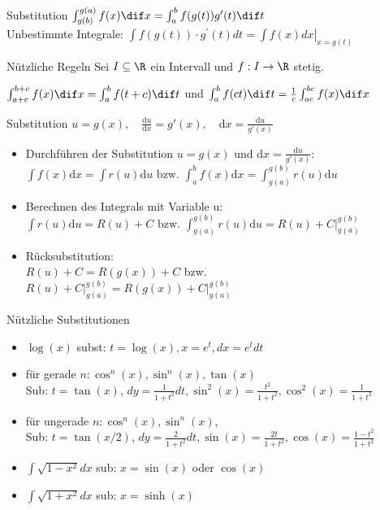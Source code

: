 \begin{theorem}{Substitution}
    $\int_{g(b)}^{g(a)} f(x) \dif x = \int_{a}^b f(g(t)) g'(t) \dif t$
    \vspace{1mm}\\
   Unbestimmte Integrale: $\int f(g(t)) \cdot g^{\prime}(t) d t=\left.\int f(x) d x\right|_{x=g(t)}$
\end{theorem}

\begin{corollary}{Nützliche Regeln}
	Sei $I \subseteq \R$ ein Intervall und $f: I \to \R$ stetig.
    
    $\int_{a+c}^{b+c} f(x) \dif x = \int_{a}^{b} f(t+c) \dif t$ und $\int_{a}^{b} f(ct) \dif t = \frac{1}{c} \int_{ac}^{bc} f(x) \dif x$
\end{corollary}

\begin{KR}{Substitution}
    $u=g(x),\quad \frac{\mathrm{d}u}{\mathrm{d}x}=g'(x),\quad \mathrm{d}x = \frac{\mathrm{d}u}{g'(x)} $
    \begin{itemize}
	\item Durchführen der Substitution \(u=g(x) \)	 und \(\mathrm{d}x=\frac{\mathrm{d}u}{g'(x)} \):\\
	    $\int{f(x)\mathrm{d}x}=\int{r(u)}{\mathrm{d}u} \text{ bzw. } \int_a^b{f(x)\mathrm{d}x}=\int_{g(a)}^{g(b)}{r(u)}{\mathrm{d}u}$
	\item Berechnen des Integrals mit Variable u:\\
	    $\int{r(u)\mathrm{d}u}=R(u)+C \text{ bzw. } \int_{g(a)}^{g(b)}{r(u)\mathrm{d}u}=R(u)+C\Big|_{g(a)}^{g(b)}$
	\item Rücksubstitution:\\
	    $R(u)+C=R(g(x))+C$ bzw. $R(u)+C\Big|_{g(a)}^{g(b)}=R(g(x))+C\Big|_{g(a)}^{g(b)}$
    \end{itemize}	
\end{KR}


\begin{example2}{Nützliche Substitutionen}
    \begin{itemize}
        \item $\log (x)$ subst: $t=\log (x), x=e^{t}, d x=e^{t} d t$
        \item für gerade $n: \cos ^{n}(x), \sin ^{n}(x), \tan (x)$ \\Sub: $t=\tan (x)$, $d y=\frac{1}{1+t^{2}} d t, \sin ^{2}(x)=\frac{t^{2}}{1+t^{2}}, \cos ^{2}(x)=\frac{1}{1+t^{2}}$
        \item für ungerade $n: \cos ^{n}(x), \sin ^{n}(x)$, \\Sub: $t=\tan (x / 2)$, $d y=\frac{2}{1+t^{2}} d t, \sin (x)=\frac{2 t}{1+t^{2}}, \cos (x)=\frac{1-t^{2}}{1+t^{2}}$
        \item $\int \sqrt{1-x^{2}} d x$ sub: $x=\sin (x)$ oder $\cos (x)$
        \item $\int \sqrt{1+x^{2}} d x$ sub: $x=\sinh (x)$
    \end{itemize}
\end{example2}

